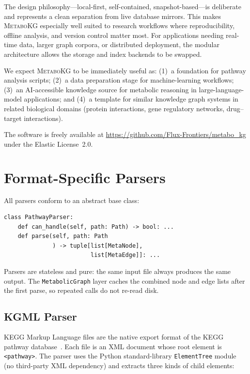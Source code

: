 \documentclass[10pt]{article}
\begin{document}
The design philosophy---local-first, self-contained, snapshot-based---is
deliberate and represents a clean separation from live database mirrors. This
makes \textsc{MetaboKG} especially well suited to research workflows where
reproducibility, offline analysis, and version control matter most. For
applications needing real-time data, larger graph corpora, or distributed
deployment, the modular architecture allows the storage and index backends to
be swapped.

We expect \textsc{MetaboKG} to be immediately useful as: (1)~a foundation for
pathway analysis scripts; (2)~a data preparation stage for machine-learning
workflows; (3)~an AI-accessible knowledge source for metabolic reasoning in
large-language-model applications; and (4)~a template for similar knowledge
graph systems in related biological domains (protein interactions, gene
regulatory networks, drug--target interactions).

The software is freely available at
\url{https://github.com/Flux-Frontiers/metabo_kg} under the Elastic License~2.0.

\appendix

\section{Format-Specific Parsers}
\label{sec:parsers-detail}

All parsers conform to an abstract base class:

\begin{lstlisting}[style=python]
class PathwayParser:
    def can_handle(self, path: Path) -> bool: ...
    def parse(self, path: Path
              ) -> tuple[list[MetaNode],
                         list[MetaEdge]]: ...
\end{lstlisting}

Parsers are stateless and pure: the same input file always produces the same
output. The \texttt{MetabolicGraph} layer caches the combined node and edge
lists after the first parse, so repeated calls do not re-read disk.

\subsection{KGML Parser}

KEGG Markup Language files are the native export format of the KEGG pathway
database~\citep{kanehisa2021kegg}. Each file is an XML document whose root
element is \texttt{<pathway>}. The parser uses the Python standard-library
\texttt{ElementTree} module (no third-party XML dependency) and extracts three
kinds of child elements:
\end{document}
